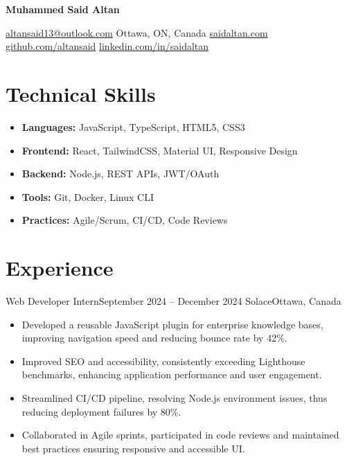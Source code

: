 \documentclass[a4paper,10pt]{article}
\begin{document}
\begin{center}
    \textbf{\huge Muhammed Said Altan} \\

    \vspace{2mm}

    \href{mailto:altansaid13@outlook.com}{altansaid13@outlook.com} \textbullet{} 
    Ottawa, ON, Canada \textbullet{} 
    \href{https://saidaltan.com}{saidaltan.com} \textbullet{}
    \href{https://github.com/altansaid}{github.com/altansaid} \textbullet{}
    \href{https://linkedin.com/in/saidaltan}{linkedin.com/in/saidaltan}

    \vspace{2mm}
\end{center}

\section*{Technical Skills}
\begin{itemize}[leftmargin=0.15in, label={}]
    \item \textbf{Languages:} JavaScript, TypeScript, HTML5, CSS3
    \item \textbf{Frontend:} React, TailwindCSS, Material UI, Responsive Design
    \item \textbf{Backend:} Node.js, REST APIs, JWT/OAuth
    \item \textbf{Tools:} Git, Docker, Linux CLI
    \item \textbf{Practices:} Agile/Scrum, CI/CD, Code Reviews
\end{itemize}

\section*{Experience}
\resumeSubheading
{Web Developer Intern}{September 2024 -- December 2024}
{Solace}{Ottawa, Canada}
\begin{itemize}
    \item Developed a reusable JavaScript plugin for enterprise knowledge bases, improving navigation speed and reducing bounce rate by 42\%.
    \item Improved SEO and accessibility, consistently exceeding Lighthouse benchmarks, enhancing application performance and user engagement.
    \item Streamlined CI/CD pipeline, resolving Node.js environment issues, thus reducing deployment failures by 80\%.
    \item Collaborated in Agile sprints, participated in code reviews and maintained best practices ensuring responsive and accessible UI.
\end{itemize}
\end{document}
